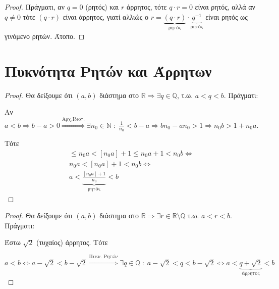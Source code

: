 \documentclass[main.tex]{subfiles}
\begin{document}

\begin{proof}
  Πράγματι, αν $ q=0 $ (ρητός) και $ r $ άρρητος, τότε $ q \cdot r =0 $ είναι ρητός, 
  αλλά αν $ q \neq 0 $ τότε $ (q \cdot r) $ είναι άρρητος, γιατί αλλιώς ο 
  $ r = \underbrace{(q \cdot r)}_{\text{ρητός}} \cdot \underbrace{q^{-1}}_{\text{
  ρητός}} $ είναι ρητός ως γινόμενο ρητών. Άτοπο.
\end{proof}


\section{Πυκνότητα Ρητών και Άρρητων}


\begin{proof}
\item {}
  Θα δείξουμε ότι $ (a,b) $ διάστημα στο $ \mathbb{R} \Rightarrow \exists q 
  \in \mathbb{Q} $, τ.ω. $ a < q < b $. Πράγματι:

  Αν $ a<b \Rightarrow b-a >0 \overset{\text{Αρχ.Ιδιοτ.}}{\Rightarrow} \exists 
  n_{0} \in \mathbb{N} \; : \; \frac{1}{n_{0}} < b-a \Rightarrow b n_{0} - a n_{0} 
  >1 \Rightarrow n_{0}b > 1+ n_{0}a$.

  Τότε 
  \begin{gather*}
    [n_{0}a] \leq n_{0}a < [n_{0}a]+1 \leq n_{0}a +1 < n_{0}b \Leftrightarrow \\
    n_{0}a < [n_{0}a]+1 < n_{0}b \Leftrightarrow \\
    a < \underbrace{\frac{[n_{0}a]+1}{n_{0}}}_{\text{ρητός}}< b
  \end{gather*}
\end{proof}


\begin{proof}
  Θα δείξουμε ότι $ (a,b) $ διάστημα στο $ \mathbb{R} \Rightarrow \exists r \in 
  \mathbb{R} \setminus \mathbb{Q} $ τ.ω. $a < r < b$. Πράγματι:

  Έστω $ \sqrt{2} $ (τυχαίος) άρρητος. Τότε

  $ a < b \Leftrightarrow a - \sqrt{2} < b- \sqrt{2} \overset{\text{Πυκν. Ρητών}}{\Rightarrow} \exists q \in \mathbb{Q} \; : \;  a - \sqrt{2} < q < b - 
  \sqrt{2} \Leftrightarrow  a < \underbrace{q + \sqrt{2}}_{\text{άρρητος}} < b $ 
\end{proof}
\end{document}
